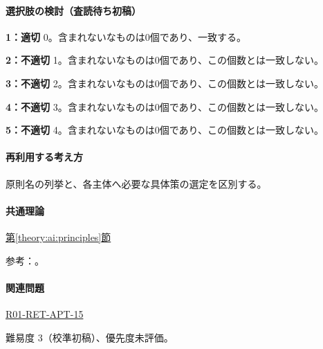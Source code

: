 \paragraph{選択肢の検討（査読待ち初稿）}\mbox{}\par

\noindent\textbf{1：適切} 0。含まれないなものは0個であり、一致する。\par

\noindent\textbf{2：不適切} 1。含まれないなものは0個であり、この個数とは一致しない。\par

\noindent\textbf{3：不適切} 2。含まれないなものは0個であり、この個数とは一致しない。\par

\noindent\textbf{4：不適切} 3。含まれないなものは0個であり、この個数とは一致しない。\par

\noindent\textbf{5：不適切} 4。含まれないなものは0個であり、この個数とは一致しない。\par

\paragraph{再利用する考え方} 原則名の列挙と、各主体へ必要な具体策の選定を区別する。

\paragraph{共通理論} \hyperref[theory:ai:principles]{第\ref*{theory:ai:principles}節}

\par 参考：\cite{ai_use2019}。

\paragraph{関連問題} \hyperref[q:r01-ret-apt-15]{R01-RET-APT-15}

\par 難易度 3（校準初稿）、優先度未評価。
